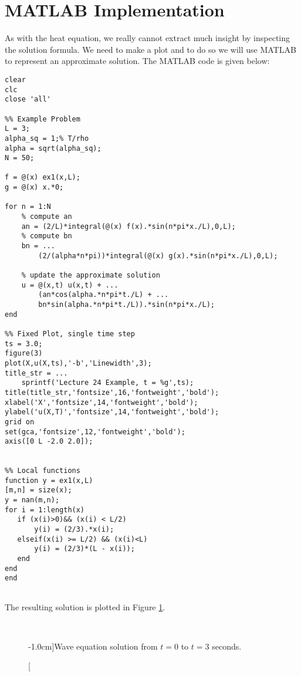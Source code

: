 \section{MATLAB Implementation}
As with the heat equation, we really cannot extract much insight by inspecting the solution formula.  We need to make a plot and to do so we will use MATLAB to represent an approximate solution.
The MATLAB code is given below:
\begin{lstlisting}[name=lec24_ex, style=myMatlab]
clear
clc
close 'all'

%% Example Problem
L = 3;
alpha_sq = 1;% T/rho
alpha = sqrt(alpha_sq);
N = 50;

f = @(x) ex1(x,L);
g = @(x) x.*0;

for n = 1:N
    % compute an
    an = (2/L)*integral(@(x) f(x).*sin(n*pi*x./L),0,L);
    % compute bn
    bn = ...
        (2/(alpha*n*pi))*integral(@(x) g(x).*sin(n*pi*x./L),0,L);
    
    % update the approximate solution
    u = @(x,t) u(x,t) + ...
        (an*cos(alpha.*n*pi*t./L) + ...
        bn*sin(alpha.*n*pi*t./L)).*sin(n*pi*x./L); 
end

%% Fixed Plot, single time step
ts = 3.0;
figure(3)
plot(X,u(X,ts),'-b','Linewidth',3);
title_str = ...
    sprintf('Lecture 24 Example, t = %g',ts);
title(title_str,'fontsize',16,'fontweight','bold');
xlabel('X','fontsize',14,'fontweight','bold');
ylabel('u(X,T)','fontsize',14,'fontweight','bold');
grid on
set(gca,'fontsize',12,'fontweight','bold');
axis([0 L -2.0 2.0]);


%% Local functions
function y = ex1(x,L)
[m,n] = size(x);
y = nan(m,n);
for i = 1:length(x)
   if (x(i)>0)&& (x(i) < L/2)
       y(i) = (2/3).*x(i);
   elseif(x(i) >= L/2) && (x(i)<L)
       y(i) = (2/3)*(L - x(i));
   end
end
end


\end{lstlisting}
The resulting solution is plotted in Figure \ref{fig:lec24-ex1}.
\begin{fullwidth}
\begin{figure}
\\
\label{fig:lec24-ex1}
\caption[][-1.0cm]{Wave equation solution from $t=0$ to $t=3$ seconds.}
\end{figure}
\end{fullwidth}

